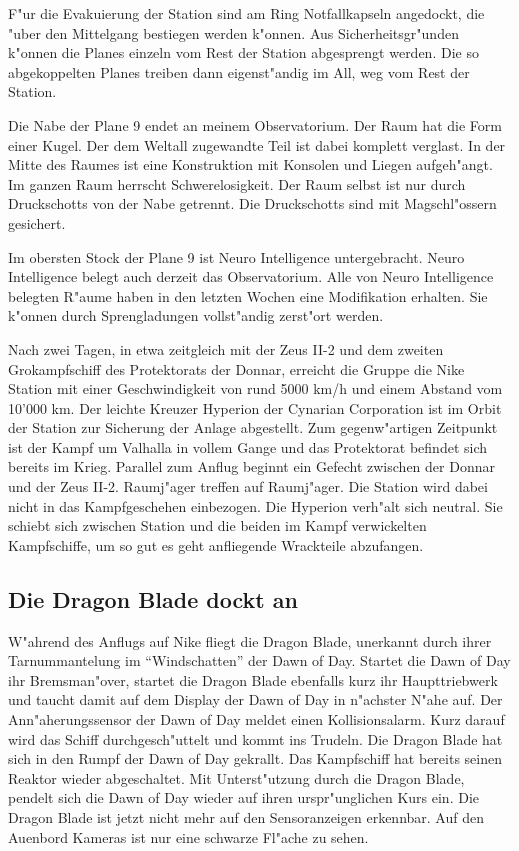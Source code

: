 F"ur die Evakuierung der Station sind am Ring Notfallkapseln angedockt, die "uber den Mittelgang bestiegen werden k"onnen. Aus Sicherheitsgr"unden k"onnen die Planes einzeln vom Rest der Station abgesprengt werden. Die so abgekoppelten Planes treiben dann eigenst"andig im All, weg vom Rest der Station. 

Die Nabe der Plane 9 endet an meinem Observatorium. Der Raum hat die Form einer Kugel. Der dem Weltall zugewandte Teil ist dabei komplett verglast. In der Mitte des Raumes ist eine Konstruktion mit Konsolen und Liegen aufgeh"angt. Im ganzen Raum herrscht Schwerelosigkeit. Der Raum selbst ist nur durch Druckschotts von der Nabe getrennt. Die Druckschotts sind mit Magschl"ossern gesichert. 

Im obersten Stock der Plane 9 ist Neuro Intelligence untergebracht. Neuro Intelligence belegt auch derzeit das Observatorium. Alle von Neuro Intelligence belegten R"aume haben in den letzten Wochen eine Modifikation erhalten. Sie k"onnen durch Sprengladungen vollst"andig zerst"ort werden.



Nach zwei Tagen, in etwa zeitgleich mit der Zeus II-2 und dem zweiten Gro\3kampfschiff des Protektorats der Donnar, erreicht die Gruppe die Nike Station mit einer Geschwindigkeit von rund 5000 km/h und einem Abstand vom 10'000 km. Der leichte Kreuzer Hyperion der Cynarian Corporation ist im Orbit der Station zur Sicherung der Anlage abgestellt. Zum gegenw"artigen Zeitpunkt ist der Kampf um Valhalla in vollem Gange und das Protektorat befindet sich bereits im Krieg. Parallel zum Anflug beginnt ein Gefecht zwischen der Donnar und der Zeus II-2. Raumj"ager treffen auf Raumj"ager. Die Station wird dabei nicht in das Kampfgeschehen einbezogen. Die Hyperion verh"alt sich neutral. Sie schiebt sich zwischen Station und die beiden im Kampf verwickelten Kampfschiffe, um so gut es geht anfliegende Wrackteile abzufangen.

\subsection{Die Dragon Blade dockt an}
W"ahrend des Anflugs auf Nike fliegt die Dragon Blade, unerkannt durch ihrer Tarnummantelung im "`Windschatten"' der Dawn of Day. Startet die Dawn of Day ihr Bremsman"over, startet die Dragon Blade ebenfalls kurz ihr Haupttriebwerk und taucht damit auf dem Display der Dawn of Day in n"achster N"ahe auf. Der Ann"aherungssensor der Dawn of Day meldet einen Kollisionsalarm. Kurz darauf wird das Schiff durchgesch"uttelt und kommt ins Trudeln. Die Dragon Blade hat sich in den Rumpf der Dawn of Day gekrallt. Das Kampfschiff hat bereits seinen Reaktor wieder abgeschaltet. Mit Unterst"utzung durch die Dragon Blade, pendelt sich die Dawn of Day wieder auf ihren urspr"unglichen Kurs ein. Die Dragon Blade ist jetzt nicht mehr auf den Sensoranzeigen erkennbar. Auf den Au\3enbord Kameras ist nur eine schwarze Fl"ache zu sehen.

